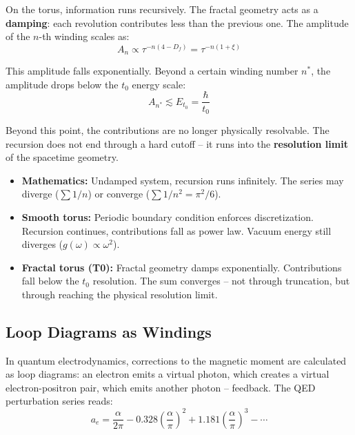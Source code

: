	On the torus, information runs recursively. The fractal geometry acts as a \textbf{damping}: each revolution contributes less than the previous one. The amplitude of the $n$-th winding scales as:
	\begin{equation}
		A_n \propto \tau^{-n(4-D_f)} = \tau^{-n(1+\xi)}
	\end{equation}
	
	This amplitude falls exponentially. Beyond a certain winding number $n^*$, the amplitude drops below the $t_0$ energy scale:
	\begin{equation}
		A_{n^*} \lesssim E_{t_0} = \frac{\hbar}{t_0}
	\end{equation}
	
	Beyond this point, the contributions are no longer physically resolvable. The recursion does not end through a hard cutoff -- it runs into the \textbf{resolution limit} of the spacetime geometry.
	
	\begin{keypoint}
		\begin{itemize}
			\item \textbf{Mathematics:} Undamped system, recursion runs infinitely. The series may diverge ($\sum 1/n$) or converge ($\sum 1/n^2 = \pi^2/6$).
			\item \textbf{Smooth torus:} Periodic boundary condition enforces discretization. Recursion continues, contributions fall as power law. Vacuum energy still diverges ($g(\omega) \propto \omega^2$).
			\item \textbf{Fractal torus (T0):} Fractal geometry damps exponentially. Contributions fall below the $t_0$ resolution. The sum converges -- not through truncation, but through reaching the physical resolution limit.
		\end{itemize}
	\end{keypoint}
	
	\subsection{Loop Diagrams as Windings}
	
	In quantum electrodynamics, corrections to the magnetic moment are calculated as loop diagrams: an electron emits a virtual photon, which creates a virtual electron-positron pair, which emits another photon -- feedback. The QED perturbation series reads:
	\begin{equation}
		a_e = \frac{\alpha}{2\pi} - 0.328 \left(\frac{\alpha}{\pi}\right)^2 + 1.181 \left(\frac{\alpha}{\pi}\right)^3 - \cdots
	\end{equation}
	
